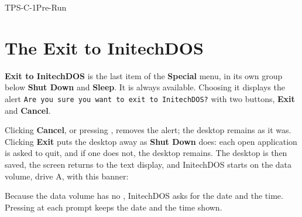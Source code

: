 \begin{Checklist}{TPS-C-1}{Pre-Run}
\end{Checklist}

\section{The Exit to InitechDOS}
\textbf{Exit to InitechDOS} is the last item of the \textbf{Special} menu,
in its own group below \textbf{Shut Down} and \textbf{Sleep}.  It is always
available.  Choosing it displays the alert \texttt{Are you sure you want to
exit to InitechDOS?} with two buttons, \textbf{Exit} and \textbf{Cancel}.

Clicking \textbf{Cancel}, or pressing , removes the alert; the
desktop remains as it was.  Clicking \textbf{Exit} puts the desktop away as
\textbf{Shut Down} does: each open application is asked to quit, and if one
does not, the desktop remains.  The desktop is then saved, the screen
returns to the text display, and InitechDOS starts on the data volume,
drive A, with this banner:


Because the data volume has no , InitechDOS asks for the
date and the time.  Pressing  at each prompt keeps the date and
the time shown.

